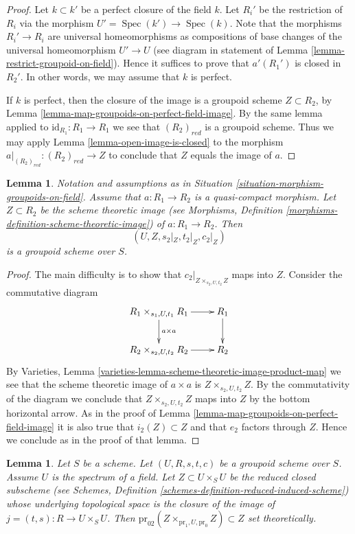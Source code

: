 \documentclass{stacks-project}
\theoremstyle{plain}
\newtheorem{lemma}[subsection]{Lemma}
\theoremstyle{definition}
\theoremstyle{remark}
\numberwithin{equation}{subsection}
\def\Spec{\mathop{\mathrm{Spec}}}
\begin{document}
\begin{proof}
Let $k \subset k'$ be a perfect closure of the field $k$.
Let $R_i'$ be the restriction of $R_i$ via the morphism
$U' = \Spec(k') \to \Spec(k)$. Note that the
morphisms $R_i' \to R_i$ are universal homeomorphisms as
compositions of base changes of the universal homeomorphism
$U' \to U$ (see diagram in statement of
Lemma \ref{lemma-restrict-groupoid-on-field}).
Hence it suffices to prove that $a'(R_1')$ is closed
in $R_2'$. In other words, we may assume that $k$ is perfect.

\medskip\noindent
If $k$ is perfect, then the closure of the image is
a groupoid scheme $Z \subset R_2$, by
Lemma \ref{lemma-map-groupoids-on-perfect-field-image}.
By the same lemma applied to
$\text{id}_{R_1} : R_1 \to R_1$
we see that $(R_2)_{red}$ is a groupoid scheme.
Thus we may apply
Lemma \ref{lemma-open-image-is-closed}
to the morphism
$a|_{(R_2)_{red}} : (R_2)_{red} \to Z$
to conclude that $Z$ equals the image of $a$.
\end{proof}

\begin{lemma}
\label{lemma-quasi-compact-map-groupoids-on-field-image}
Notation and assumptions as in
Situation \ref{situation-morphism-groupoids-on-field}.
Assume that $a : R_1 \to R_2$ is a quasi-compact morphism.
Let $Z \subset R_2$ be the scheme theoretic image (see
Morphisms, Definition \ref{morphisms-definition-scheme-theoretic-image})
of $a : R_1 \to R_2$. Then
$$
(U, Z, s_2|_Z, t_2|_Z, c_2|_Z)
$$
is a groupoid scheme over $S$.
\end{lemma}

\begin{proof}
The main difficulty is to show that $c_2|_{Z \times_{s_2, U, t_2} Z}$
maps into $Z$. Consider the commutative diagram
$$
\xymatrix{
R_1 \times_{s_1, U, t_1} R_1 \ar[r] \ar[d]^{a \times a} & R_1 \ar[d] \\
R_2 \times_{s_2, U, t_2} R_2 \ar[r] & R_2
}
$$
By
Varieties, Lemma \ref{varieties-lemma-scheme-theoretic-image-product-map}
we see that the scheme theoretic image of $a \times a$ is
$Z \times_{s_2, U, t_2} Z$. By the commutativity of the diagram we
conclude that $Z \times_{s_2, U, t_2} Z$ maps into $Z$ by the bottom
horizontal arrow. As in the proof of
Lemma \ref{lemma-map-groupoids-on-perfect-field-image}
it is also true that $i_2(Z) \subset Z$ and that
$e_2$ factors through $Z$. Hence we conclude as in the
proof of that lemma.
\end{proof}

\begin{lemma}
\label{lemma-groupoid-on-field-image}
Let $S$ be a scheme. Let $(U, R, s, t, c)$ be a groupoid scheme
over $S$. Assume $U$ is the spectrum of a field.
Let $Z \subset U \times_S U$ be the reduced closed subscheme (see
Schemes, Definition \ref{schemes-definition-reduced-induced-scheme})
whose underlying topological space is the closure of the image of
$j = (t, s) : R \to U \times_S U$. Then
$\text{pr}_{02}(Z \times_{\text{pr}_1, U, \text{pr}_0} Z) \subset Z$
set theoretically.
\end{lemma}
\end{document}
